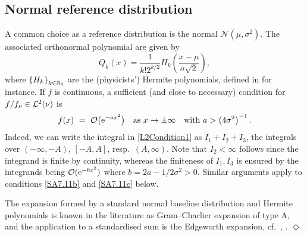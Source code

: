 \subsection{Normal reference distribution}\label{SS:NormalNu}
A common choice as a reference distribution is the normal $\mathcal{N}(\mu,\sigma^{2})$. The associated orthonormal polynomial are given by
\begin{equation}\label{eq:NormalDistributionOrthogonalPolynomial}
Q_{k}(x)=\frac{1}{k!2^{k/2}}H_{k}\left(\frac{x-\mu}{\sigma\sqrt{2}}\right),
\end{equation}
where $\left\{H_{k}\right\}_{k\in\mathbb{N}_0}$ are the (physicists') Hermite polynomials, defined in \cite{Sz39} for instance.
If $f$ is continuous, a sufficient (and close to necessary) condition for $f/f_\nu\in\mathcal{L}^2(\nu)$ is
\begin{equation}\label{SA7.11a}
f(x)\ =\ {\mathcal{O}}\big(\mathrm{e}^{-ax^2}\big)\quad\text{as }x\to\pm\infty\quad\text{with } a>\big(4\sigma^2\big)^{-1}\,.
\end{equation}
Indeed, we can  write the integral in \eqref{L2Condition1} as $I_1+I_2+I_3$, the integrals over
$(-\infty,-A)$, $[-A,A]$, resp.\ $(A,\infty)$. Note that $I_2<\infty$  follows since the integrand
is finite by continuity, whereas the finiteness of $I_1,I_3$ is ensured by the integrands
being ${\mathcal{O}}(\mathrm{e}^{-bx^2})$ where $b=2a-1/2\sigma^2>0$. Similar arguments apply to
conditions \eqref{SA7.11b} and \eqref{SA7.11c} below.
\begin{remark}
The expansion formed by a standard normal baseline distribution and Hermite polynomials is known in the literature as Gram--Charlier expansion of type A, and the application to a standardised sum is the Edgeworth expansion, cf.\ \cite{Cr99}, \cite{Barndorff1989asymptotic}. \hfill $\Diamond$
\end{remark}
%

